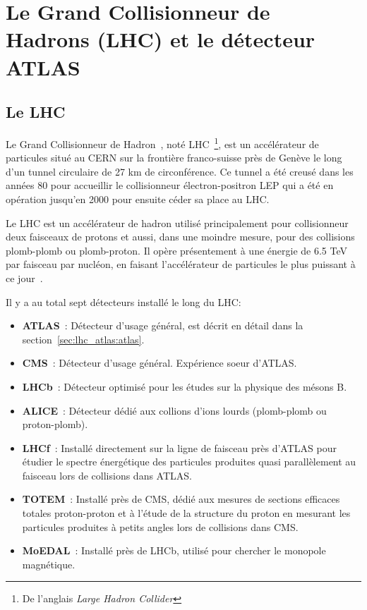 \singlespacing
\chapter{Le Grand Collisionneur de Hadrons (LHC) et le détecteur
  ATLAS}
\label{sec:lhc_atlas}
\doublespacing{}

\section{Le LHC}
\label{sec:lhc_atlas:lhc}

Le Grand Collisionneur de Hadron~\cite{evans_lhc_2008}, noté
LHC~\footnote{De l'anglais \emph{Large Hadron Collider}}, est un
accélérateur de particules situé au CERN sur la frontière franco-suisse
près de Genève le long d'un tunnel circulaire de 27 km de
circonférence.  Ce tunnel a été creusé dans les années 80 pour
accueillir le collisionneur électron-positron LEP qui a été en opération
jusqu'en 2000 pour ensuite céder sa place au LHC.

Le LHC est un accélérateur de hadron utilisé principalement pour
collisionneur deux faisceaux de protons et aussi, dans une moindre
mesure, pour des collisions plomb-plomb ou plomb-proton. Il opère
présentement à une énergie de 6.5 TeV par faisceau par nucléon, en
faisant l'accélérateur de particules le plus puissant à ce
jour~\cite{olive_parameters_2014}.

Il y a au total sept détecteurs installé le long du LHC:
\def\labelitemi{$\bullet$}
\begin{itemize}
\item \textbf{ATLAS}~\cite{collaboration_atlas_2008}: Détecteur
  d'usage général, est décrit en détail dans la
  section~\ref{sec:lhc_atlas:atlas}.
\item \textbf{CMS}~\cite{collaboration_cms_2008}: Détecteur d'usage
  général. Expérience soeur d'ATLAS.
\item \textbf{LHCb}~\cite{nakada_lhcb_2000}: Détecteur optimisé pour
  les études sur la physique des mésons B.
\item \textbf{ALICE}~\cite{collaboration_alice_2008}: Détecteur dédié
  aux collions d'ions lourds (plomb-plomb ou proton-plomb).
\item \textbf{LHCf}~\cite{collaboration_lhcf_2008}: Installé
  directement sur la ligne de faisceau près d'ATLAS pour étudier le
  spectre énergétique des particules produites quasi parallèlement au
  faisceau lors de collisions dans ATLAS.
\item \textbf{TOTEM}~\cite{collaboration_totem_2008}: Installé près de
  CMS, dédié aux mesures de sections efficaces totales proton-proton
  et à l'étude de la structure du proton en mesurant les particules
  produites à petits angles lors de collisions dans CMS.
\item \textbf{MoEDAL}~\cite{Pinfold:1181486}: Installé près de LHCb,
  utilisé pour chercher le monopole magnétique. \\
\end{itemize}

